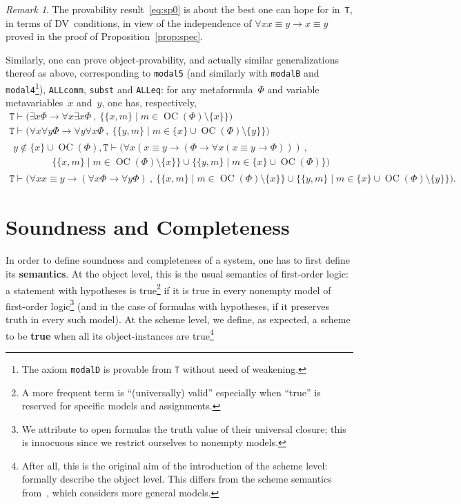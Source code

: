 \documentclass[11pt]{article}
\newcommand*{\comma}{\:,\:}
\newcommand*{\define}[1]{\textbf{#1}}%
\DeclareMathOperator{\OC}{OC}
\theoremstyle{plain}
\theoremstyle{definition}
\theoremstyle{remark}
\newtheorem{remark}[theorem]{Remark}
\begin{document}
\begin{remark}
The provability result~\eqref{eq:sp0} is about the best one can hope for in~\texttt{T}, in terms of
DV~conditions, in view of the independence of $\forall x x \equiv y \to x \equiv y$ proved in the
proof of Proposition~\ref{prop:spec}.

Similarly, one can prove object-provability, and actually similar generalizations thereof as above,
corresponding to \texttt{modal5} (and similarly with \texttt{modalB} and
\texttt{modal4}\footnote{The axiom \texttt{modalD} is provable from \texttt{T} without need of
weakening.}), \texttt{ALLcomm}, \texttt{subst} and \texttt{ALLeq}:
for any metaformula~$\Phi$ and variable metavariables~$x$ and~$y$, one has, respectively,
\begin{gather}
\texttt{T} \vdash 
\Big(
\exists x \Phi \to \forall x \exists x \Phi
\comma
\big\{ \{x, m\} \mid m \in \OC(\Phi) \setminus \{x\} \big\}
\Big)\\
\texttt{T} \vdash 
\Big(
\forall x \forall y \Phi \to \forall y \forall x \Phi
\comma
\big\{ \{y, m\} \mid m \in \{x\} \cup \OC(\Phi) \setminus \{y\} \big\}
\Big)\\
\begin{multlined}
y \notin \{ x \} \cup \OC(\Phi), \texttt{T} \vdash 
\Big(
\forall x (x \equiv y \to (\Phi \to \forall x (x \equiv y \to \Phi)))
\comma\qquad\qquad\\\qquad\qquad
\big\{ \{x, m\} \mid m \in \OC(\Phi) \setminus \{x\} \big\} \cup
\big\{ \{y, m\} \mid m \in \{x\} \cup \OC(\Phi) \big\} 
\Big)
\end{multlined}\\
\texttt{T} \vdash 
\Big(
\forall x x \equiv y \to (\forall x \Phi \to \forall y \Phi)
\comma
\big\{ \{x, m\} \mid m \in \OC(\Phi) \setminus \{x\} \big\} \cup
\big\{ \{y, m\} \mid m \in \{x\} \cup \OC(\Phi) \setminus \{y\} \big\} 
\Big).
\end{gather}
\end{remark}




\section{Soundness and Completeness}
\label{sec:complete}

In order to define soundness and completeness of a system, one has to first define its
\define{semantics}.
At the object level, this is the usual semantics of first-order logic: a statement with hypotheses
is true\footnote{\label{footnote:valid}A more frequent term is ``(universally) valid\rlap{,}''
especially when ``true'' is reserved for specific models and assignments.} if it is true in every
nonempty model of first-order logic\footnote{We attribute to open formulas the truth value of their
universal closure; this is innocuous since we restrict ourselves to nonempty models.} (and in the
case of formulas with hypotheses, if it preserves truth in every such model).
At the scheme level, we define, as expected, a scheme to be \define{true} when all its
object-instances are true\footnote{After all, this is the original aim of the introduction
of the scheme level: formally describe the object level. This differs from the scheme
semantics from~\cite{carneiro}, which considers more general models.}
\end{document}
